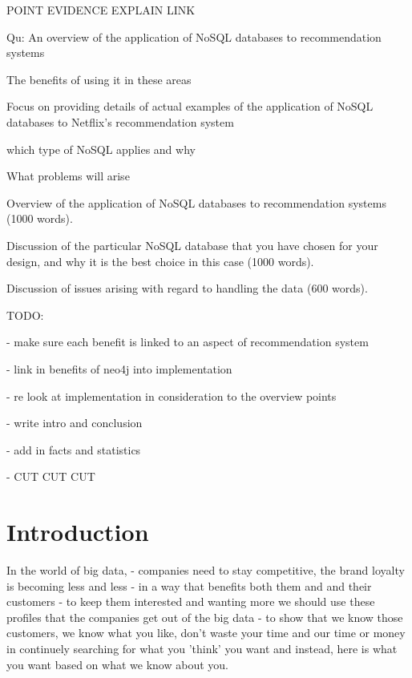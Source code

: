 \documentclass[a4paper]{article}
\begin{document}
\justify

POINT
EVIDENCE
EXPLAIN
LINK

Qu:
An overview of the application of NoSQL databases to recommendation systems \par
    The benefits of using it in these areas \par
Focus on providing details of actual examples of the application of NoSQL databases to Netflix's recommendation system \par
    which type of NoSQL applies and why \par
    What problems will arise \par

Overview of the application of NoSQL databases to recommendation systems (1000 words). \par
Discussion of the particular NoSQL database that you have chosen for your design, and why it is the best choice in this case (1000 words).\par
Discussion of issues arising with regard to handling the data (600 words). \par


\par
TODO: \par
- make sure each benefit is linked to an aspect of recommendation system \par
- link in benefits of neo4j into implementation \par
    - re look at implementation in consideration to the overview points \par
- write intro and conclusion \par
- add in facts and statistics \par
- CUT CUT CUT \par


\section{Introduction}
\label{sec:Introduction}
In the world of big data,
- companies need to stay competitive, the brand loyalty is becoming less and less
- in a way that benefits both them and and their customers
- to keep them interested and wanting more we should use these profiles that the companies get out of the big data
- to show that we know those customers, we know what you like, don't waste your time and our time or money in continuely searching for what you 'think' you want and instead, here is what you want based on what we know about you.
\end{document}
